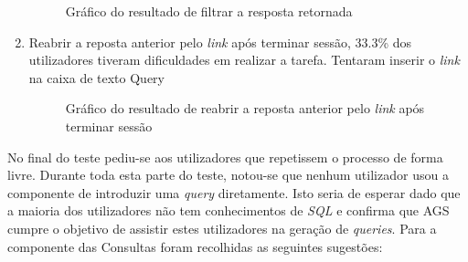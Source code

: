 \documentclass[11pt,twoside,a4paper]{report}
\begin{document}
\begin{enumerate}
\begin{figure}[H]
	\caption{Gráfico do resultado de filtrar a resposta retornada}
	\label{fig:resultados07}
\end{figure}
\newpage
	\item Reabrir a reposta anterior pelo \textit{link} após terminar sessão, 33.3\% dos utilizadores tiveram dificuldades em realizar a tarefa. Tentaram inserir o \textit{link} na caixa de texto Query
\begin{figure}[H]
	\centering
	\hspace{-0.5cm}
	\caption{Gráfico do resultado de reabrir a reposta anterior pelo \textit{link} após terminar sessão}
	\label{fig:resultados08}
\end{figure}
\end{enumerate}
No final do teste pediu-se aos utilizadores que repetissem o processo de forma livre. Durante toda esta parte do teste, notou-se que nenhum utilizador usou a componente de introduzir uma \textit{query} diretamente. Isto seria de esperar dado que a maioria dos utilizadores não tem conhecimentos de \textit{SQL} e confirma que AGS cumpre o objetivo de assistir estes utilizadores na geração de \textit{queries}.
Para a componente das Consultas foram recolhidas as seguintes sugestões:
\end{document}

